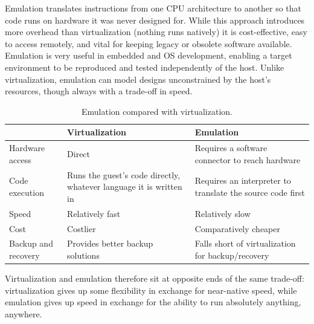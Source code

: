 Emulation translates instructions from one CPU architecture to another so that code runs on hardware it was never designed for. While this approach introduces more overhead than virtualization (nothing runs natively) it is cost-effective, easy to access remotely, and vital for keeping legacy or obsolete software available. Emulation is very useful in embedded and OS development, enabling a target environment to be reproduced and tested independently of the host. Unlike virtualization, emulation can model designs unconstrained by the host's resources, though always with a trade-off in speed.

\vspace{-0.5em}

\begin{table}[H]
    \centering
    \small
    \setlength{\tabcolsep}{4pt}
    \renewcommand{\arraystretch}{1.1}
    \begin{tabular}{p{}|p{}p{}}
         & \textbf{Virtualization} & \textbf{Emulation} \\
        \hline
        Hardware access & Direct & Requires a software connector to reach hardware \\
        Code execution & Runs the guest's code directly, whatever language it is written in & Requires an interpreter to translate the source code first \\
        Speed & Relatively fast & Relatively slow \\
        Cost & Costlier & Comparatively cheaper \\
        Backup and recovery & Provides better backup solutions & Falls short of virtualization for backup/recovery \\
    \end{tabular}
    \caption{Emulation compared with virtualization.}
    \vspace{-0.5em}

    \label{tab:emulation-vs-virtualization}
    \vspace{-0.5em}

\end{table}

Virtualization and emulation therefore sit at opposite ends of the same trade-off: virtualization gives up some flexibility in exchange for near-native speed, while emulation gives up speed in exchange for the ability to run absolutely anything, anywhere.
